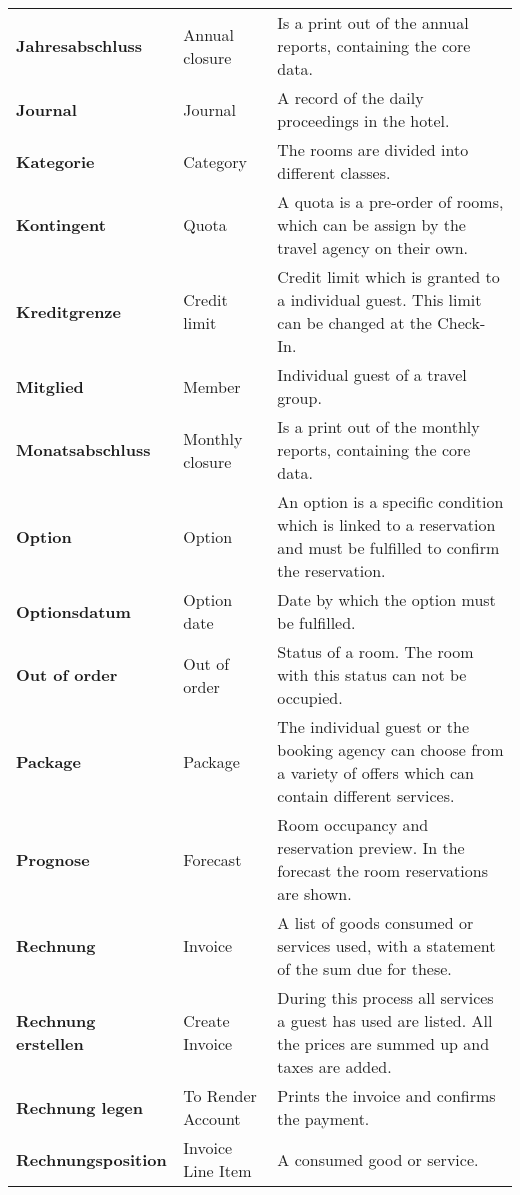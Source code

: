\documentclass[../Pflichtenheft.tex]{subfiles}
\begin{document}
\begin{longtable}{p{4cm} p{4cm} p{6cm}}
		\textbf{Jahresabschluss} & {Annual closure} & Is a print out of the annual reports, containing the core data. \\[0.5cm]
		\textbf{Journal} & {Journal} & A record of the daily proceedings in the hotel. \\[0.5cm]
        \textbf{Kategorie} & {Category} & The rooms are divided into different classes. \\[0.5cm]
        \textbf{Kontingent} & {Quota} & A quota is a pre-order of rooms, which can be assign by the travel agency on their own. \\[0.5cm]
        \textbf{Kreditgrenze} & {Credit limit} & Credit limit which is granted to a individual guest. This limit can be changed at the Check-In. \\[0.5cm]
        \textbf{Mitglied} & {Member} & Individual guest of a travel group. \\[0.5cm]
        \textbf{Monatsabschluss} & {Monthly closure} & Is a print out of the monthly reports, containing the core data. \\[0.5cm]
        \textbf{Option} & {Option} & An option is a specific condition which is linked to a reservation and must be fulfilled to confirm the reservation. \\[0.5cm]
        \textbf{Optionsdatum} & {Option date} & Date by which the option must be fulfilled. \\[0.5cm]
        \textbf{Out of order} & {Out of order} & Status of a room. The room with this status can not be occupied. \\[0.5cm]
        \textbf{Package} & {Package} & The individual guest or the booking agency can choose from a variety of offers which can contain different services. \\[0.5cm]
        \textbf{Prognose} & {Forecast} & Room occupancy and reservation preview. In the forecast the room reservations are shown. \\[0.5cm]
        \textbf{Rechnung} & {Invoice} & A list of goods consumed or services used, with a statement of the sum due for these. \\[0.5cm]
        \textbf{Rechnung erstellen} & {Create Invoice} & During this process all services a guest has used are listed. All the prices are summed up and taxes are added. \\[0.5cm]
        \textbf{Rechnung legen} & {To Render Account} & Prints the invoice and confirms the payment. \\[0.5cm]
        \textbf{Rechnungsposition} & {Invoice Line Item} & A consumed good or service. \\[0.5cm]

\end{longtable}
\end{document}
